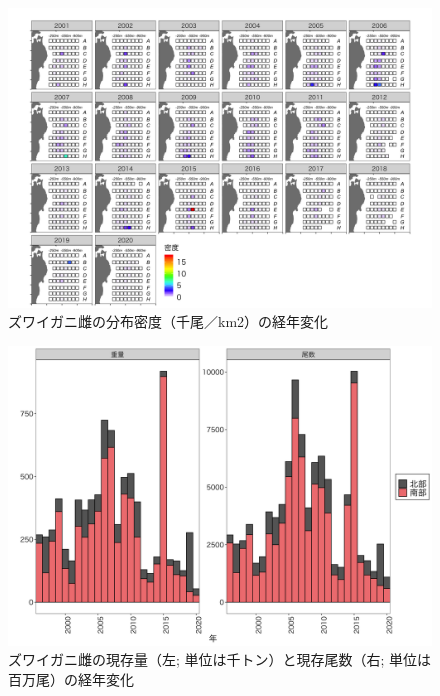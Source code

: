 \documentclass[11pt]{article} %
\begin{document}
\begin{linenumbers}
\begin{figure}[h]
  \centering
  \includegraphics[width = 14cm]{ズワイガニ雌dens.png}
  \caption{ズワイガニ雌の分布密度（千尾／km2）の経年変化}
\end{figure}

\begin{figure}[h]
  \centering
  \includegraphics[width = 14cm]{ズワイガニ雌trend.png}
  \caption{ズワイガニ雌の現存量（左; 単位は千トン）と現存尾数（右; 単位は百万尾）の経年変化}
\end{figure}


\end{linenumbers}
\end{document}
